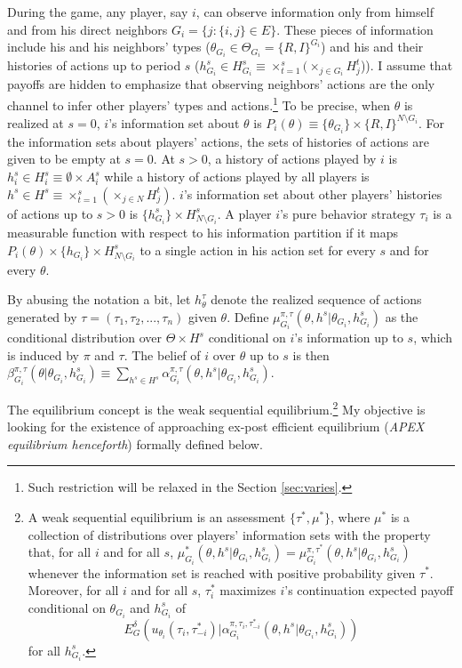 \documentclass[12pt,letter]{article}
\theoremstyle{definition}
\theoremstyle{remark}
\theoremstyle{claim}
\begin{document}
During the game, any player, say $i$, can observe information only from himself and from his direct neighbors $G_i=\{j:\{i,j\}\in E\}$. These pieces of information include his and his neighbors' types ($\theta_{G_i}\in \Theta_{G_i}=\{R,I\}^{G_i}$) and his and their histories of actions up to period $s$ ($h^s_{G_i}\in H^s_{G_i}\equiv\times^s_{t=1}(\times_{j\in G_i}H^t_j$)). I assume that payoffs are hidden to emphasize that observing neighbors' actions are the only channel to infer other players' types and actions.\footnote{Such restriction will be relaxed in the Section \ref{sec:varies}.} 
To be precise, when $\theta$ is realized at $s=0$, $i$'s information set about $\theta$ is $P_{i}(\theta)\equiv\{\theta_{G_i}\}\times \{R,I\}^{N\setminus G_i}$. For the information sets about players' actions, the sets of histories of actions are given to be empty at $s=0$. At $s>0$, a history of actions played by $i$ is $h^s_i\in H^s_{i}\equiv\emptyset\times A^s_i$ while a history of actions played by all players is $h^s\in H^s\equiv\times^s_{t=1}(\times_{j\in N}H^t_j)$. $i$'s information set about other players' histories of actions up to $s>0$ is $\{h^s_{G_i}\}\times H^s_{N\setminus G_i}$. A player $i$'s pure behavior strategy $\tau_{i}$ is a measurable function with respect to his information partition if it maps $P_i(\theta)\times \{h_{G_i}\}\times H^s_{N\setminus G_i}$ to a single action in his action set for every $s$ and for every $\theta$. 

By abusing the notation a bit, let $h^{\tau}_\theta$ denote the realized sequence of actions generated by $\tau=(\tau_1,\tau_2,...,\tau_n)$ given $\theta$. Define $\mu^{\pi,\tau}_{G_i}(\theta, h^{s}|\theta_{G_i},h^{s}_{G_i})$ as the conditional distribution over $\Theta\times H^s$ conditional on $i$'s information up to $s$, which is induced by $\pi$ and $\tau$. The belief of $i$ over $\theta$ up to $s$ is then $\beta^{\pi,\tau}_{G_i}(\theta|\theta_{G_i},h^{s}_{G_i})\equiv \sum_{h^{s}\in H^s}\alpha^{\pi,\tau}_{G_i}(\theta, h^{s}|\theta_{G_i},h^{s}_{G_i})$.

The equilibrium concept is the weak sequential equilibrium.\footnote{A weak sequential equilibrium is an assessment $\{\tau^{*}, \mu^{*}\}$, where $\mu^{*}$ is a collection of distributions over players' information sets with the property that, for all $i$ and for all $s$, $\mu^{*}_{G_i}(\theta, h^{s}|\theta_{G_i},h^{s}_{G_i})=\mu^{\pi,\tau^{*}}_{G_i}(\theta, h^{s}|\theta_{G_i},h^{s}_{G_i})$ whenever the information set is reached with positive probability given $\tau^{*}$. Moreover, for all $i$ and for all $s$, $\tau^{*}_{i}$ maximizes $i$'s continuation expected payoff conditional on $\theta_{G_i}$ and $h^{s}_{G_i}$ of
\[E^{\delta}_G(u_{\theta_i}(\tau_{i},\tau^{*}_{-i})|\alpha^{\pi,\tau_{i},\tau^{*}_{-i}}_{G_i}(\theta, h^{s}|\theta_{G_i},h^{s}_{G_i}))\] for all $h^{s}_{G_i}$.} 
My objective is looking for the existence of approaching ex-post efficient equilibrium (\textit{APEX equilibrium henceforth}) formally defined below.
\end{document}
